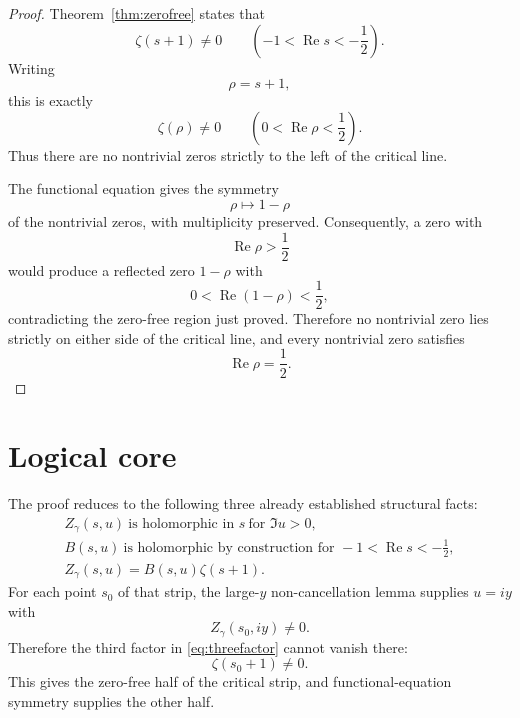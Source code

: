 \documentclass[11pt]{amsart}
\theoremstyle{remark}
\newcommand{\Ree}{\operatorname{Re}}
\begin{document}
\begin{proof}
Theorem~\ref{thm:zerofree} states that
\[
\zeta(s+1)\neq0
\qquad
\left(-1<\Ree s< -\frac12\right).
\]
Writing
\[
\rho=s+1,
\]
this is exactly
\[
\zeta(\rho)\neq0
\qquad
\left(0<\Ree\rho<\frac12\right).
\]
Thus there are no nontrivial zeros strictly to the left of the critical line.

The functional equation gives the symmetry
\[
\rho\longmapsto1-\rho
\]
of the nontrivial zeros, with multiplicity preserved.  Consequently, a zero with
\[
\Ree\rho>\frac12
\]
would produce a reflected zero $1-\rho$ with
\[
0<\Ree(1-\rho)<\frac12,
\]
contradicting the zero-free region just proved.  Therefore no nontrivial zero lies strictly on either side of the critical line, and every nontrivial zero satisfies
\[
\boxed{\Ree\rho=\frac12.}
\]
\end{proof}

\section{Logical core}

The proof reduces to the following three already established structural facts:
\[
\boxed{
\begin{array}{c}
Z_\gamma(s,u)\ \text{is holomorphic in }s\ \text{for }\Im u>0,\\[1mm]
B(s,u)\ \text{is holomorphic by construction for }-1<\Ree s<-\tfrac12,\\[1mm]
Z_\gamma(s,u)=B(s,u)\zeta(s+1).
\end{array}
}
\]
For each point $s_0$ of that strip, the large-$y$ non-cancellation lemma supplies $u=iy$ with
\[
Z_\gamma(s_0,iy)\neq0.
\]
Therefore the third factor in \eqref{eq:threefactor} cannot vanish there:
\[
\zeta(s_0+1)\neq0.
\]
This gives the zero-free half of the critical strip, and functional-equation symmetry supplies the other half.
\end{document}

